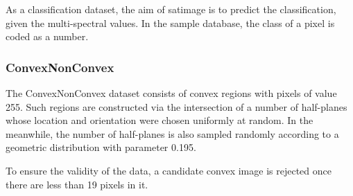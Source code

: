 \documentclass[12pt,a4paper]{article}
\theoremstyle{definition}
\begin{document}
\begin{appendix}
\vspace{0.01\linewidth}
As a classification dataset, the aim of satimage is to predict the classification, given the multi-spectral values. In the sample database, the class of a pixel is coded as a number.

\subsubsection{ConvexNonConvex \cite{convex}}

The ConvexNonConvex dataset consists of convex regions with pixels of value 255. Such regions are constructed via the intersection of a number of half-planes whose location and orientation were chosen uniformly at random. In the meanwhile, the number of half-planes is also sampled randomly according to a geometric distribution with parameter 0.195.

\vspace{0.01\linewidth}
To ensure the validity of the data, a candidate convex image is rejected once there are less than 19 pixels in it.


\end{appendix}



\end{document}
